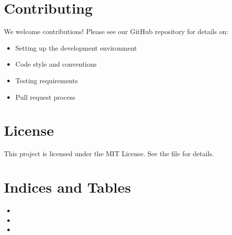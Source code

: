 \documentclass[letterpaper,10pt,english]{sphinxmanual}
\begin{document}
\chapter{Contributing}
\label{\detokenize{index:contributing}}
\sphinxAtStartPar
We welcome contributions! Please see our GitHub repository for details on:
\begin{itemize}
\item {} 
\sphinxAtStartPar
Setting up the development environment

\item {} 
\sphinxAtStartPar
Code style and conventions

\item {} 
\sphinxAtStartPar
Testing requirements

\item {} 
\sphinxAtStartPar
Pull request process

\end{itemize}


\chapter{License}
\label{\detokenize{index:license}}
\sphinxAtStartPar
This project is licensed under the MIT License. See the  file for details.


\chapter{Indices and Tables}
\label{\detokenize{index:indices-and-tables}}\begin{itemize}
\item {} 
\sphinxAtStartPar
{}

\item {} 
\sphinxAtStartPar
{}

\item {} 
\sphinxAtStartPar
{}

\end{itemize}



\renewcommand{\indexname}{Index}
\printindex
\end{document}
